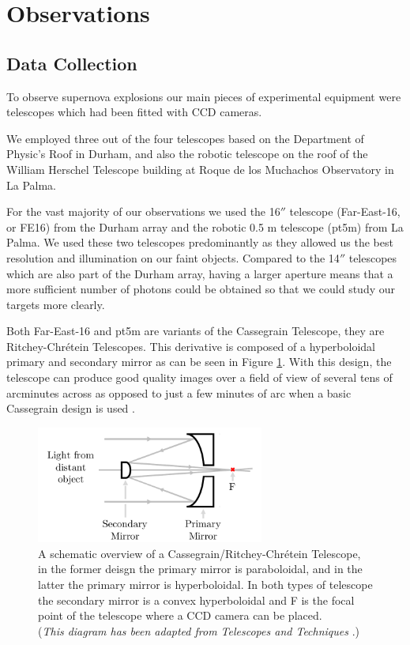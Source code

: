 \documentclass[twocolumn]{revtex4}
\newcommand{\squeezeup}{\vspace{-2.5mm}}
\begin{document}
\vspace{-3ex}
\section{Observations} 
\label{obsver}
\vspace{-2ex}
\subsection{Data Collection}
\label{observer-collection}
\vspace{-2ex}
To observe supernova explosions our main pieces of experimental equipment were telescopes which had been fitted with CCD cameras.

We employed three out of the four telescopes based on the Department of Physic's Roof in Durham, and also the robotic telescope on the roof of the William Herschel Telescope building at Roque de los Muchachos Observatory in La Palma.

For the vast majority of our observations we used the 16$''$ telescope (Far-East-16, or FE16) from the Durham array and the robotic 0.5 m telescope (pt5m) from La Palma. We used these two telescopes predominantly as they allowed us the best resolution and illumination on our faint objects. Compared to the 14$''$ telescopes which are also part of the Durham array, having a larger aperture means that a more sufficient number of photons could be obtained so that we could study our targets more clearly. 

Both Far-East-16 and pt5m are variants of the Cassegrain Telescope, they are Ritchey-Chr\'{e}tein Telescopes. This derivative is composed of a hyperboloidal primary and secondary mirror \cite{tel_tech} as can be seen in Figure \ref{cassegrain}. With this design, the telescope can produce good quality images over a field of view of several tens of arcminutes across as opposed to just a few minutes of arc when a basic Cassegrain design is used \cite{tel_tech}. 
\squeezeup
\begin{figure}[!h]
\begin{center}
\includegraphics[width=7.5cm]{observations/cassegrain}
\caption[]{A schematic overview of a Cassegrain/Ritchey-Chr\'{e}tein Telescope, in the former deisgn the primary mirror is paraboloidal, and in the latter the primary mirror is hyperboloidal. In both types of telescope the secondary mirror is a convex hyperboloidal and F is the focal point of the telescope where a CCD camera can be placed. \\ (\textit{This diagram has been adapted from Telescopes and Techniques} \cite{tel_tech}.)}
\label{cassegrain}
\end{center}
\end{figure}
\squeezeup
\squeezeup
\end{document}
